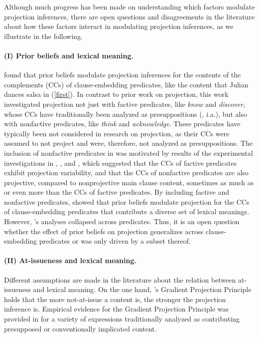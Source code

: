 \documentclass[11pt,fleqn]{article}
\newcommand{\6}{\mbox{$[\hspace*{-.6mm}[$}}
\newcommand{\9}{\mbox{$]\hspace*{-.6mm}]$}}
\newcommand{\citepos}[1]{\citeauthor{#1}'s \citeyear{#1}}
\begin{document}
Although much progress has been made on understanding which factors modulate projection inferences, there are open questions and disagreements in the literature about how these factors interact in modulating projection inferences, as we illustrate in the following.

\paragraph{(I) Prior beliefs and lexical meaning.} \citealt{degen-tonhauser-openmind} found that prior beliefs modulate projection inferences for the contents of the complements (CCs) of clause-embedding predicates, like the content that Julian dances salsa in (\ref{first}). In contrast to prior work on projection, this work investigated projection not just with factive predicates, like {\em know} and {\em discover}, whose CCs have traditionally been analyzed as presuppositions (\citealt{kiparsky-kiparsky70,karttunen71b}, i.a.), but also with nonfactive predicates, like {\em think} and {\em acknowledge}. These predicates have typically been not considered in research on projection, as their CCs were assumed to not project and were, therefore, not analyzed as presuppositions.  The inclusion of nonfactive predicates in \citealt{degen-tonhauser-openmind} was motivated by results of the experimental investigations in \citealt{demarneffe-etal-sub23}, \citealt{tbd-variability}, and \citealt{degen-tonhauser-language}, which suggested that the CCs of factive predicates exhibit projection variability, and that the CCs of nonfactive predicates are also projective, compared to nonprojective main clause content, sometimes as much as or even more than the CCs of factive predicates. By including factive and nonfactive predicates, \citealt{degen-tonhauser-openmind} showed that prior beliefs modulate projection for the CCs of clause-embedding predicates that contribute a diverse set of lexical meanings. However, \citepos{degen-tonhauser-openmind} analyses collapsed across predicates. Thus, it is an open question whether the effect of prior beliefs on projection generalizes across clause-embedding predicates or was only driven by a subset thereof. 

\paragraph{(II) At-issueness and lexical meaning.} Different assumptions are made in the literature about the relation between at-issueness and lexical meaning. On the one hand, \citepos{tbd-variability} Gradient Projection Principle holds that the more not-at-issue a content is, the stronger the projection inference is. Empirical evidence for the Gradient Projection Principle was provided in \citealt{tbd-variability} for a variety of expressions traditionally analyzed as contributing presupposed or conventionally implicated content.
\end{document}
